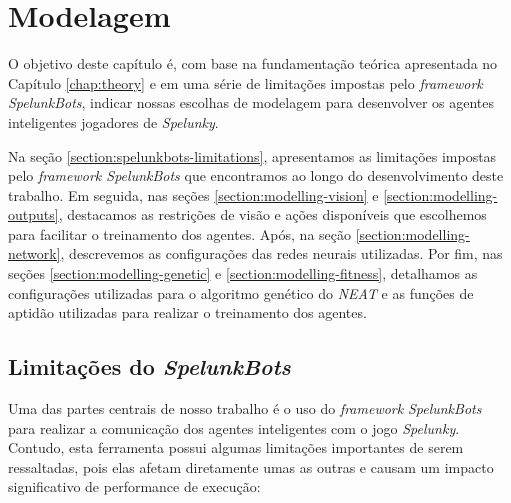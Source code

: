 \chapter{\label{chap:modeling}Modelagem}
O objetivo deste capítulo é, com base na fundamentação teórica apresentada no
Capítulo \ref{chap:theory} e em uma série de limitações impostas pelo
\textit{framework SpelunkBots}, indicar nossas escolhas de modelagem para
desenvolver os agentes inteligentes jogadores de \textit{Spelunky}.

Na seção \ref{section:spelunkbots-limitations}, apresentamos as limitações
impostas pelo \textit{framework SpelunkBots} que encontramos ao longo do
desenvolvimento deste trabalho. Em seguida, nas seções
\ref{section:modelling-vision} e \ref{section:modelling-outputs}, destacamos as
restrições de visão e ações disponíveis que escolhemos para facilitar o
treinamento dos agentes. Após, na seção \ref{section:modelling-network},
descrevemos as configurações das redes neurais utilizadas. Por fim, nas seções
\ref{section:modelling-genetic} e \ref{section:modelling-fitness}, detalhamos as
configurações utilizadas para o algoritmo genético do \textit{NEAT} e as funções
de aptidão utilizadas para realizar o treinamento dos agentes.


\section{\label{section:spelunkbots-limitations}Limitações do
\textit{SpelunkBots}}
Uma das partes centrais de nosso trabalho é o uso do \textit{framework}
\textit{SpelunkBots} para realizar a comunicação dos agentes inteligentes com o
jogo \textit{Spelunky}. Contudo, esta ferramenta possui algumas limitações
importantes de serem ressaltadas, pois elas afetam diretamente umas as outras e
causam um impacto significativo de performance de execução:

